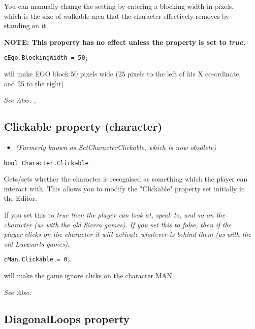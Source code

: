 You can manually change the setting by entering a blocking width in pixels, which is the
size of walkable area that the character effectively removes by standing on it.

\bf{NOTE:} This property has no effect unless the  property
is set to \it{true}.

\begin{verbatim}
cEgo.BlockingWidth = 50;
\end{verbatim}
will make EGO block 50 pixels wide (25 pixels to the left of his X co-ordinate, and 25 to the right)

\it{See Also:} ,


\subsection{Clickable property (character)}\label{Character.Clickable}%

\begin{itemize}
\item \it{(Formerly known as SetCharacterClickable, which is now obsolete)}
\end{itemize}

\begin{verbatim}
bool Character.Clickable
\end{verbatim}
Gets/sets whether the character is recognised as something which the
player can interact with. This allows you to modify the "Clickable"
property set initially in the Editor.

If you set this to \it{true} then the player can look at, speak to, and so on
the character (as with the old Sierra games). If you set this to \it{false}, then
if the player clicks on the character it will activate whatever is behind
them (as with the old Lucasarts games).

\begin{verbatim}
cMan.Clickable = 0;
\end{verbatim}
will make the game ignore clicks on the character MAN.

\it{See Also:} 


\subsection{DiagonalLoops property}\label{Character.DiagonalLoops}%

